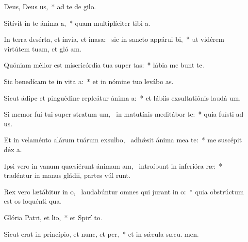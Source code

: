 \item Deus, Deus us,~* ad te de  gilo.
\item Sitívit in te ánima a,~* quam multiplíciter tibi  a.
\item In terra desérta, et ínvia, et inasa:~\pscross{} sic in sancto appárui bi,~* ut vidérem virtútem tuam, et gló am.
\item Quóniam mélior est misericórdia tua super tas:~* lábia me bunt te.
\item Sic benedícam te in vita a:~* et in nómine tuo levábo  as.
\item Sicut ádipe et pinguédine repleátur ánima a:~* et lábiis exsultatiónis laudá  um.
\item Si memor fui tui super stratum um,~\pscross{} in matutínis meditábor  te:~* quia fuísti ad us.
\item Et in velaménto alárum tuárum exsulbo,~\pscross{} adhǽsit ánima mea  te:~* me suscépit déx a.
\item Ipsi vero in vanum quæsiérunt ánimam am,~\pscross{} introíbunt in inferióra ræ:~* tradéntur in manus gládii, partes vúl runt.
\item Rex vero lætábitur in o,~\pscross{} laudabúntur omnes qui jurant in o:~* quia obstrúctum est os loquénti qua.
\item Glória Patri, et lio,~* et Spirí to.
\item Sicut erat in princípio, et nunc, et per,~* et in sǽcula sæcu. men.
